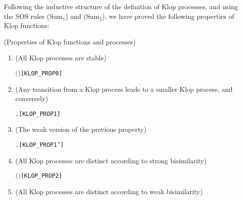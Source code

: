 Following the inductive structure of the definition of Klop processes,
  and using the SOS rules
  ($\mathrm{Sum}_1$) and ($\mathrm{Sum}_2$), we have proved
the following properties of Klop functions:
\begin{proposition}{(Properties of Klop functions and processes)}
\begin{enumerate}
\item (All Klop processes are stable)
\begin{alltt}
\HOLTokenTurnstile{}  \ensuremath{(}  \ensuremath{)}\hfill[KLOP_PROP0]
\end{alltt}
\item (Any transition from a Klop process leads to a smaller Klop
  process, and conversely)
\begin{alltt}
\HOLTokenTurnstile{}    \HOLTokenTransBegin{} \HOLTokenTransEnd {} \HOLSymConst{\HOLTokenEquiv{}} \HOLSymConst{\HOLTokenExists{}}.  \HOLSymConst{\HOLTokenLt{}}  \HOLSymConst{\HOLTokenConj{}}  \HOLSymConst{\ensuremath{=}}   \hfill{[KLOP_PROP1]}
\end{alltt}
\item (The weak version of the previous property)
\begin{alltt}
\HOLTokenTurnstile{}    \HOLTokenWeakTransBegin{} \HOLTokenWeakTransEnd {} \HOLSymConst{\HOLTokenEquiv{}} \HOLSymConst{\HOLTokenExists{}}.  \HOLSymConst{\HOLTokenLt{}}  \HOLSymConst{\HOLTokenConj{}}  \HOLSymConst{\ensuremath{=}}   \hfill{[KLOP_PROP1']}
\end{alltt}
\item (All Klop processes are distinct according to strong bisimilarity)
\begin{alltt}
\HOLTokenTurnstile{}  \HOLSymConst{\HOLTokenLt{}}  \HOLSymConst{\HOLTokenImp{}} \HOLSymConst{\HOLTokenNeg{}}\ensuremath{(}   \HOLSymConst{\HOLTokenStrongEQ}   \ensuremath{)}\hfill{[KLOP_PROP2]}
\end{alltt}
\item (All Klop processes are distinct according to weak bisimilarity)

\end{enumerate}
\end{proposition}
